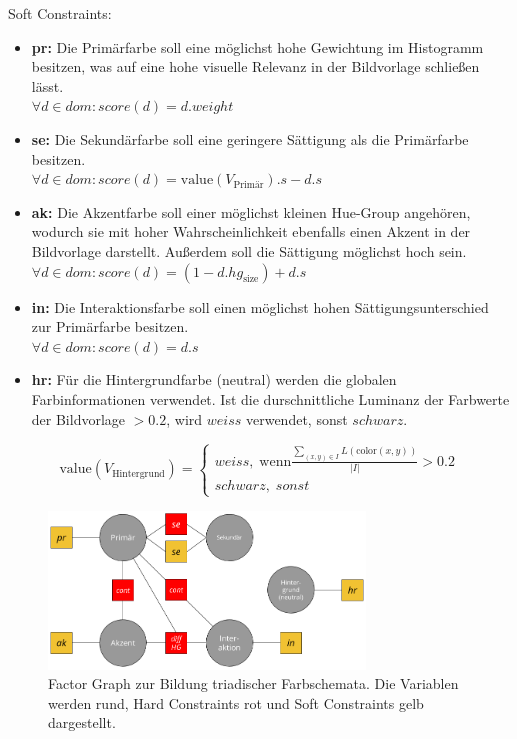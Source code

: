 Soft Constraints:
\begin{itemize}
	\item \textbf{pr:} Die Primärfarbe soll eine möglichst hohe Gewichtung im Histogramm besitzen, was auf eine hohe visuelle Relevanz in der Bildvorlage schließen lässt.\\
		$\forall d \in dom: score(d) = d.weight$
	\item \textbf{se:} Die Sekundärfarbe soll eine geringere Sättigung als die Primärfarbe besitzen.\\
		$\forall d \in dom: score(d) = \text{value}(V_\text{Primär}).s - d.s$
	\item \textbf{ak:} Die Akzentfarbe soll einer möglichst kleinen Hue-Group angehören, wodurch sie mit hoher Wahrscheinlichkeit ebenfalls einen Akzent in der Bildvorlage darstellt. Außerdem soll die Sättigung möglichst hoch sein.\\
		$\forall d \in dom: score(d) = (1 - d.hg_\text{size}) + d.s$
	\item \textbf{in:} Die Interaktionsfarbe soll einen möglichst hohen Sättigungsunterschied zur Primärfarbe besitzen.\\
		$\forall d \in dom: score(d) = d.s$
	\item \textbf{hr:} Für die Hintergrundfarbe (neutral) werden die globalen Farbinformationen verwendet. Ist die durschnittliche Luminanz der Farbwerte der Bildvorlage $> 0.2$, wird $weiss$ verwendet, sonst $schwarz$.
\end{itemize}

\begin{equation*}
  \text{value}(V_\text{Hintergrund}) =
  \begin{cases}
  	weiss, \; \text{wenn} \frac{\sum_{(x, y) \in I} L(\text{color}(x, y))}{|I|} > 0.2\\
  	schwarz, \; sonst
  \end{cases}
\end{equation*}

\begin{figure}[h]
\centering
\includegraphics[width=0.75\textwidth]{img/scheme_triadic.png}
\caption{Factor Graph zur Bildung triadischer Farbschemata. Die Variablen werden rund, Hard Constraints rot und Soft Constraints gelb dargestellt.}
\label{fig:scheme_triadic}
\end{figure}

